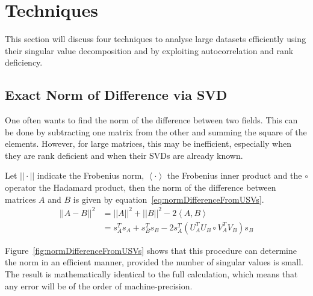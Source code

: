 \documentclass{acm_proc_article-sp}
\begin{document}
\section{Techniques}
\label{Techniques}

This section will discuss four techniques to analyse large datasets efficiently using their singular value decomposition and by exploiting autocorrelation and rank deficiency.

\subsection{Exact Norm of Difference via SVD}
\label{sec:Techniques Exact Norm of Difference via SVD}

One often wants to find the norm of the difference between two fields. This can be done by subtracting one matrix from the other and summing the square of the elements. However, for large matrices, this may be inefficient, especially when they are rank deficient and when their SVDs are already known.

Let $|| \cdot ||$ indicate the Frobenius norm, $\left\langle \cdot \right\rangle$ the Frobenius inner product and the $\circ$ operator the Hadamard product, then the norm of the difference between matrices $A$ and $B$ is given by equation~\ref{eq:normDifferenceFromUSVs}.
\begin{equation}
\label{eq:normDifferenceFromUSVs}
\begin{split}
||A-B||^{2} & = ||A||^{2} + ||B||^{2} - 2 \left\langle A, B \right\rangle \\
& = s_{A}^{T} s_{A} +  s_{B}^{T} s_{B} - 2 s_{A}^{T} \left( U_{A}^{T} U_{B} \circ V_{A}^{T} V_{B} \right) s_{B}
\end{split}
\end{equation}

Figure~\ref{fig:normDifferenceFromUSVs} shows that this procedure can determine the norm in an efficient manner, provided the number of singular values is small. The result is mathematically identical to the full calculation, which means that any error will be of the order of machine-precision.
\end{document}
